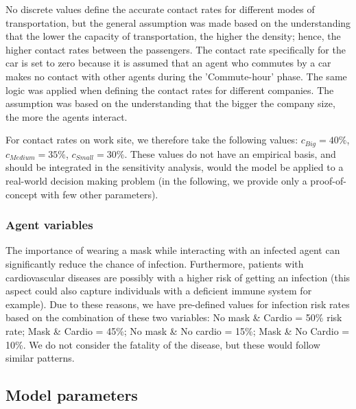 \documentclass[smallextended]{svjour3}       %
\begin{document}
No discrete values define the accurate contact rates for different modes of transportation, but the general assumption was made based on the understanding that the lower the capacity of transportation, the higher the density; hence, the higher contact rates between the passengers. The contact rate specifically for the car is set to zero because it is assumed that an agent who commutes by a car makes no contact with other agents during the 'Commute-hour' phase. The same logic was applied when defining the contact rates for different companies. The assumption was based on the understanding that the bigger the company size, the more the agents interact.

For contact rates on work site, we therefore take the following values: $c_{Big} = 40\%$, $c_{Medium} = 35\%$, $c_{Small} = 30\%$. These values do not have an empirical basis, and should be integrated in the sensitivity analysis, would the model be applied to a real-world decision making problem (in the following, we provide only a proof-of-concept with few other parameters).


\subsubsection{Agent variables}


The importance of wearing a mask while interacting with an infected agent can significantly reduce the chance of infection. Furthermore, patients with cardiovascular diseases are possibly with a higher risk of getting an infection \cite{ielapi2020cardiovascular} (this aspect could also capture individuals with a deficient immune system for example). Due to these reasons, we have pre-defined values for infection risk rates based on the combination of these two variables: No mask \& Cardio = 50\% risk rate; Mask \& Cardio = 45\%; No mask \& No cardio = 15\%; Mask \& No Cardio = 10\%. We do not consider the fatality of the disease, but these would follow similar patterns.




\subsection{Model parameters}
\end{document}
